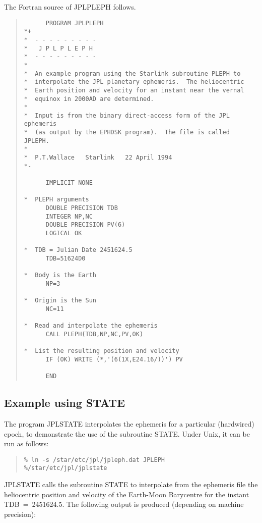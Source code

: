 \documentclass[twoside,11pt]{article}
\newcommand{\xlabel}[1]{}
\renewcommand{\_}{\texttt{\symbol{95}}}
\newcommand{\latexonlysmall}{\small}
\newcommand{\latexonlysmall}{}
\begin{document}
The Fortran source of JPLPLEPH follows.
   
\begin{quote}
\latexonlysmall
\begin{verbatim}
      PROGRAM JPLPLEPH
*+
*  - - - - - - - - -
*   J P L P L E P H
*  - - - - - - - - -
*
*  An example program using the Starlink subroutine PLEPH to
*  interpolate the JPL planetary ephemeris.  The heliocentric
*  Earth position and velocity for an instant near the vernal
*  equinox in 2000AD are determined.
*
*  Input is from the binary direct-access form of the JPL ephemeris
*  (as output by the EPHDSK program).  The file is called JPLEPH.
*
*  P.T.Wallace   Starlink   22 April 1994
*-

      IMPLICIT NONE

*  PLEPH arguments
      DOUBLE PRECISION TDB
      INTEGER NP,NC
      DOUBLE PRECISION PV(6)
      LOGICAL OK

*  TDB = Julian Date 2451624.5
      TDB=51624D0

*  Body is the Earth
      NP=3

*  Origin is the Sun
      NC=11

*  Read and interpolate the ephemeris
      CALL PLEPH(TDB,NP,NC,PV,OK)

*  List the resulting position and velocity
      IF (OK) WRITE (*,'(6(1X,E24.16/))') PV

      END
\end{verbatim}
\end{quote}

\subsection{\xlabel{example_using_state}Example using STATE}
\label{example_using_state}

The program JPLSTATE interpolates the ephemeris for a particular
(hardwired) epoch, to demonstrate the use of the subroutine STATE.
Under Unix, it can be run as follows: 

\begin{quote}
\begin{verbatim}
% ln -s /star/etc/jpl/jpleph.dat JPLEPH 
%/star/etc/jpl/jplstate
\end{verbatim}
\end{quote}

JPLSTATE calls the subroutine STATE to interpolate from the ephemeris file
the heliocentric position and velocity of the Earth-Moon Barycentre for
the instant TDB~=~2451624.5. The following output is produced (depending
on machine precision):
\end{document}
